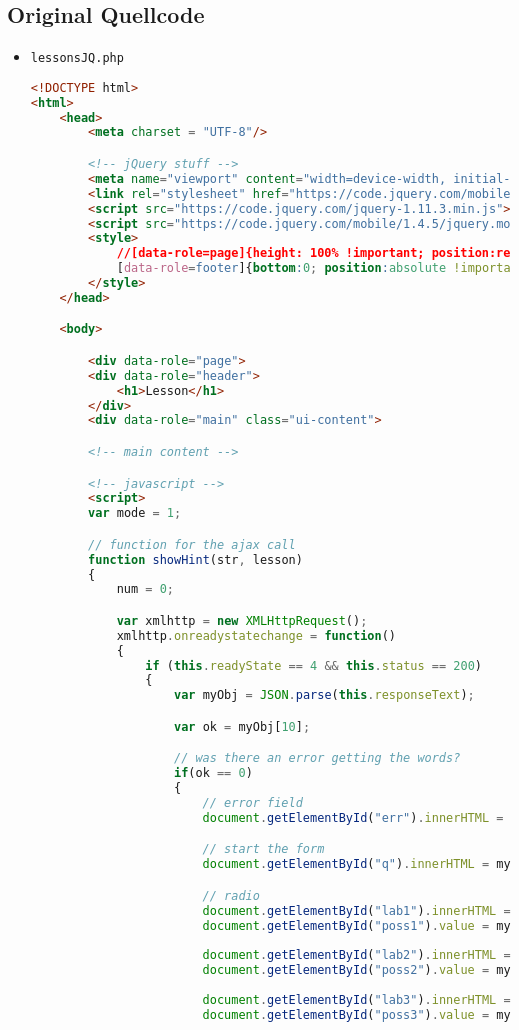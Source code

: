 \documentclass{scrartcl}
\begin{document}
\subsection{Original Quellcode}
\begin{itemize}
\item \lstinline`lessonsJQ.php`
\begin{lstlisting}[language=html]
<!DOCTYPE html>
<html>
	<head>
		<meta charset = "UTF-8"/>

		<!-- jQuery stuff -->
		<meta name="viewport" content="width=device-width, initial-scale=1">
		<link rel="stylesheet" href="https://code.jquery.com/mobile/1.4.5/jquery.mobile-1.4.5.min.css">
		<script src="https://code.jquery.com/jquery-1.11.3.min.js"></script>
		<script src="https://code.jquery.com/mobile/1.4.5/jquery.mobile-1.4.5.min.js"></script>
		<style>
			//[data-role=page]{height: 100% !important; position:relative !important;}
			[data-role=footer]{bottom:0; position:absolute !important; top: auto !important; width:100%;}
		</style>
	</head>

	<body>	

		<div data-role="page">
		<div data-role="header">
			<h1>Lesson</h1>
		</div>
		<div data-role="main" class="ui-content">

		<!-- main content -->

		<!-- javascript -->
		<script>
		var mode = 1;

		// function for the ajax call
		function showHint(str, lesson) 
		{
			num = 0;

			var xmlhttp = new XMLHttpRequest();
			xmlhttp.onreadystatechange = function()
			{
				if (this.readyState == 4 && this.status == 200)
				{
					var myObj = JSON.parse(this.responseText);

					var ok = myObj[10];

					// was there an error getting the words?
					if(ok == 0)
					{
						// error field
						document.getElementById("err").innerHTML = "";		

						// start the form
						document.getElementById("q").innerHTML = myObj[0];

						// radio
						document.getElementById("lab1").innerHTML = myObj[1];
						document.getElementById("poss1").value = myObj[1];
	
						document.getElementById("lab2").innerHTML = myObj[2];
						document.getElementById("poss2").value = myObj[2];
	
						document.getElementById("lab3").innerHTML = myObj[3];
						document.getElementById("poss3").value = myObj[3];
	

\end{lstlisting}
\end{itemize}
\end{document}

